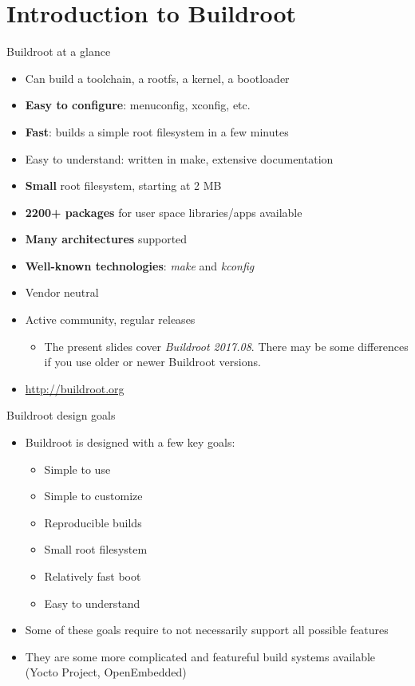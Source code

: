\section{Introduction to Buildroot}

\begin{frame}{Buildroot at a glance}
  \begin{itemize}
  \item Can build a toolchain, a rootfs, a kernel, a bootloader
  \item {\bf Easy to configure}: menuconfig, xconfig, etc.
  \item {\bf Fast}: builds a simple root filesystem in a few minutes
  \item Easy to understand: written in make, extensive documentation
  \item {\bf Small} root filesystem, starting at 2 MB
  \item {\bf 2200+ packages} for user space libraries/apps available
  \item {\bf Many architectures} supported
  \item {\bf Well-known technologies}: {\em make} and {\em kconfig}
  \item Vendor neutral
  \item Active community, regular releases
    \begin{itemize}
    \item The present slides cover {\em Buildroot 2017.08}. There may
      be some differences if you use older or newer Buildroot versions.
    \end{itemize}
  \item \url{http://buildroot.org}
  \end{itemize}
\end{frame}

\begin{frame}{Buildroot design goals}
  \begin{itemize}
  \item Buildroot is designed with a few key goals:
    \begin{itemize}
    \item Simple to use
    \item Simple to customize
    \item Reproducible builds
    \item Small root filesystem
    \item Relatively fast boot
    \item Easy to understand
    \end{itemize}
  \item Some of these goals require to not necessarily support all
    possible features
  \item They are some more complicated and featureful build systems
    available (Yocto Project, OpenEmbedded)
  \end{itemize}
\end{frame}

